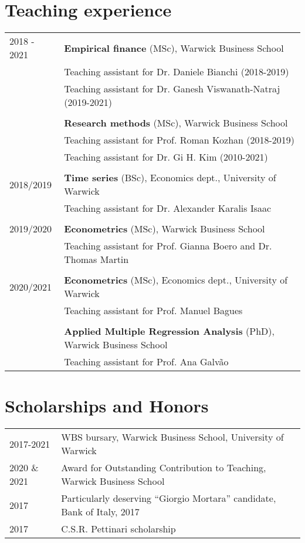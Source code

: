 \documentclass[a4paper,12pt]{article}
\begin{document}
\section{Teaching experience}
\begin{tabular}{ll}
2018 - 2021& \textbf{Empirical finance} (MSc), Warwick Business School \\
           & Teaching assistant for Dr. Daniele Bianchi (2018-2019)\\
           & Teaching assistant for Dr. Ganesh Viswanath-Natraj (2019-2021) \\
           & \\[.25em]
          & \textbf{Research methods} (MSc), Warwick Business School \\
          & Teaching assistant for Prof. Roman Kozhan (2018-2019)\\
          & Teaching assistant for Dr. Gi H. Kim (2010-2021)\\
          & \\[.25em]
2018/2019 & \textbf{Time series} (BSc), Economics dept., University of Warwick \\
          & \multicolumn{1}{l}{Teaching assistant for Dr. Alexander Karalis Isaac} \\
          & \\[.25em]
2019/2020 & \textbf{Econometrics} (MSc), Warwick Business School \\
          & \multicolumn{1}{l}{Teaching assistant for Prof. Gianna Boero and Dr. Thomas Martin }\\
          & \\[.25em]
2020/2021 & \textbf{Econometrics} (MSc), Economics dept.,  University of Warwick \\
          & \multicolumn{1}{l}{Teaching assistant for Prof. Manuel Bagues}\\
          & \\[.25em]
          & \textbf{Applied Multiple Regression Analysis} (PhD), Warwick Business School \\
          & \multicolumn{1}{l}{Teaching assistant for Prof. Ana Galv\~ao}\\
\end{tabular}

\section{Scholarships and Honors}
\begin{tabular}{ll}
2017-2021 & WBS bursary, Warwick Business School, University of Warwick\\
2020 \& 2021 & Award for Outstanding Contribution to Teaching, Warwick Business School\\
2017 & Particularly deserving “Giorgio Mortara” candidate, Bank of Italy, 2017\\
2017 & C.S.R. Pettinari scholarship\\
\end{tabular}
\newpage
\end{document}
